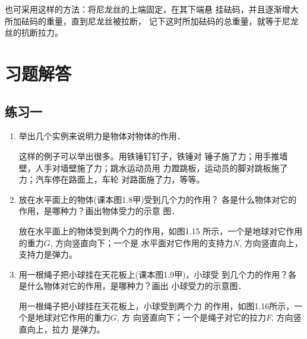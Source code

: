 也可采用这样的方法：将尼龙丝的上端固定，在其下端悬
挂砝码，并且逐渐增大所加砝码的重量，直到尼龙丝被拉断，
记下这时所加砝码的总重量，就等于尼龙丝的抗断拉力。

\section{习题解答}

\subsection{练习一}
\begin{enumerate}
\item  举出几个实例来说明力是物体对物体的作用．

\begin{solution}
    这样的例子可以举出很多。用铁锤钉钉子，铁锤对
锤子施了力；用手推墙壁，人手对墙壁施了力；跳水运动员用
力蹬跳板，运动员的脚对跳板施了力；汽车停在路面上，车轮
对路面施了力，等等。
\end{solution}
\item 放在水平面上的物体(课本图1.8甲)受到几个力的作用？
  各是什么物体对它的作用，是哪种力？画出物体受力的示意
  图．

  \begin{solution}
    放在水平面上的物体受到两个力的作用，如图1.15
    所示，一个是地球对它作用的重力$G$, 方向竖直向下；一个是
    水平面对它作用的支持力$N$, 方向竖直向上，支持力是弹力。
  \end{solution}
\item 用一根绳子把小球挂在天花板上(课本图1.9甲)，小球受
  到几个力的作用？各是什么物体对它的作用，是哪种力？画出
  小球受力的示意图．

  \begin{solution}
    用一根绳子把小球挂在天花板上，小球受到两个力
    的作用，如图1.16所示，一个是地球对它作用的重力$G$, 方
    向竖直向下；一个是绳子对它的拉力$F$, 方向竖直向上，拉力
    是弹力。
  \end{solution}


\end{enumerate}
